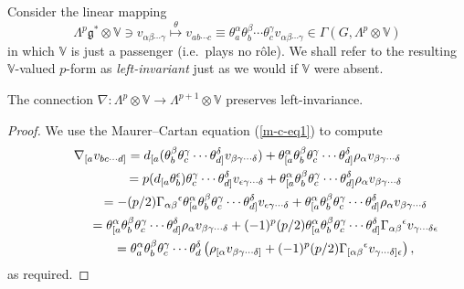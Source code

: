 Consider the linear mapping
\[\Lambda^p{\mathfrak{g}}^*\otimes{\mathbb{V}}\ni v_{\alpha\beta\cdots\gamma}
\stackrel{\theta}{\longmapsto}v_{ab\cdots c}\equiv
\theta_a^\alpha\theta_b^\beta\cdots\theta_c^\gamma
v_{\alpha\beta\cdots\gamma}\in\Gamma(G,\Lambda^p\otimes{\mathbb{V}})\]
in which ${\mathbb{V}}$ is just a passenger (i.e.~plays no r\^{o}le). We shall
refer to the resulting ${\mathbb{V}}$-valued $p$-form as {\em left-invariant\/}
just as we would if ${\mathbb{V}}$ were absent.
\begin{lemma} The connection
$\nabla:\Lambda^p\otimes{\mathbb{V}}\to\Lambda^{p+1}\otimes{\mathbb{V}}$
preserves left-invariance.\end{lemma}
\begin{proof}We use the Maurer--Cartan equation (\ref{m-c-eq1}) to compute
\begin{gather}
\nabla_{[a}v_{bc\cdots d]} =d_{[a}(\theta_b^\beta\theta_c^\gamma\cdots\theta_{d]}^\delta
v_{\beta\gamma\cdots\delta})+
\theta_{[a}^\alpha\theta_b^\beta\theta_c^\gamma\cdots\theta_{d]}^\delta
\rho_\alpha v_{\beta\gamma\cdots\delta}
\nonumber\\
 \hphantom{\nabla_{[a}v_{bc\cdots d]}}{} = p(d_{[a}\theta_b^\epsilon)\theta_c^\gamma\cdots\theta_{d]}^\delta
v_{\epsilon\gamma\cdots\delta}+
\theta_{[a}^\alpha\theta_b^\beta\theta_c^\gamma\cdots\theta_{d]}^\delta
\rho_\alpha v_{\beta\gamma\cdots\delta}
\nonumber\\
 \hphantom{\nabla_{[a}v_{bc\cdots d]}}{} =-(p/2)\Gamma_{\alpha\beta}{}^\epsilon
\theta_{[a}^\alpha\theta_b^\beta\theta_c^\gamma\cdots\theta_{d]}^\delta
v_{\epsilon\gamma\cdots\delta}+
\theta_{[a}^\alpha\theta_b^\beta\theta_c^\gamma\cdots\theta_{d]}^\delta
\rho_\alpha v_{\beta\gamma\cdots\delta}
\nonumber\\
 \hphantom{\nabla_{[a}v_{bc\cdots d]}}{} =\theta_{[a}^\alpha\theta_b^\beta\theta_c^\gamma\cdots\theta_{d]}^\delta
\rho_\alpha v_{\beta\gamma\cdots\delta}
+(-1)^p(p/2)
\theta_{[a}^\alpha\theta_b^\beta\theta_c^\gamma\cdots\theta_{d]}^\delta
\Gamma_{\alpha\beta}{}^\epsilon v_{\gamma\cdots\delta\epsilon}
\nonumber\\
 \hphantom{\nabla_{[a}v_{bc\cdots d]}}{} = \theta_a^\alpha\theta_b^\beta\theta_c^\gamma\cdots\theta_d^\delta
\left(\rho_{[\alpha}v_{\beta\gamma\cdots\delta]}
+(-1)^p(p/2)
\Gamma_{[\alpha\beta}{}^\epsilon v_{\gamma\cdots\delta]\epsilon}\right),\label{key}
\end{gather}
as required.
\end{proof}

